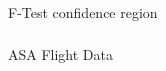 \begin{frame}[fragile] \frametitle{}

\begin{flushright}
{\color{yaleblue}\sc\fontsize{1cm}{0cm}\selectfont F-Test confidence region}
\end{flushright}

\end{frame}

\begin{frame}[fragile] \frametitle{}

\begin{flushright}
{\color{yaleblue}\sc\fontsize{1cm}{0cm}\selectfont ASA Flight Data}
\end{flushright}

\end{frame}















